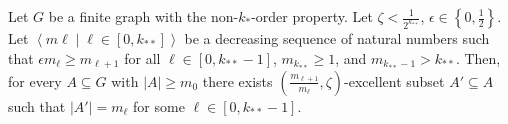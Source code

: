     \lemma[Claim 5.4.1]\label{existance_of_excellent_subsets_fixed_size_choices}
        Let $G$ be a finite graph with the non-$k_{*}$-order property.
        Let $\zeta < \frac{1}{2^{k_{**}}}$, $\epsilon \in \left\{ 0, \frac{1}{2} \right\}$.
        Let $\left< m\ell \mid \ell \in [0, k_{**}] \right>$ be a decreasing sequence of natural numbers such that
        $\epsilon m_{\ell} \geq m_{\ell+1}$ for all $\ell \in [0, k_{**}-1]$, $m_{k_{**}} \geq 1$,
        and $m_{k_{**}-1} > k_{**}$. %
        Then, for every $A \subseteq G$ with $|A| \geq m_0$ there exists
        $\left(\frac{m_{\ell+1}}{m_{\ell}}, \zeta\right)$-excellent subset $A' \subseteq A$ such that $|A'| = m_\ell$ for
        some $\ell \in [0, k_{**}-1]$.
